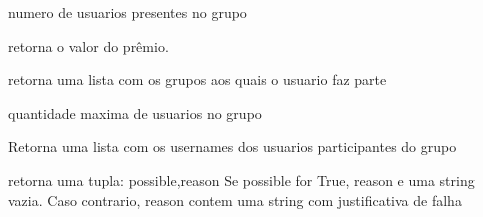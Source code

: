 \documentclass[letterpaper,10pt,english]{sphinxmanual}
\begin{document}
\begin{fulllineitems}
\begin{fulllineitems}
\end{fulllineitems}


\begin{fulllineitems}
\label{modules/models:ubet.models.Group.cur_size}
numero de usuarios presentes no grupo

\end{fulllineitems}


\begin{fulllineitems}
\label{modules/models:ubet.models.Group.get_prize}
retorna o valor do prêmio.

\end{fulllineitems}


\begin{fulllineitems}
\label{modules/models:ubet.models.Group.groups_by_user}
retorna uma lista com os grupos aos quais o usuario faz parte

\end{fulllineitems}


\begin{fulllineitems}
\label{modules/models:ubet.models.Group.max_size}
quantidade maxima de usuarios no grupo

\end{fulllineitems}


\begin{fulllineitems}
\label{modules/models:ubet.models.Group.nicks_by_group}
Retorna uma lista com os usernames dos usuarios participantes do grupo

\end{fulllineitems}


\begin{fulllineitems}
\label{modules/models:ubet.models.Group.possible_bet}
retorna uma tupla: possible,reason
Se possible for True, reason e uma string vazia.
Caso contrario, reason contem uma string com justificativa de falha


\end{fulllineitems}
\end{fulllineitems}
\end{document}

